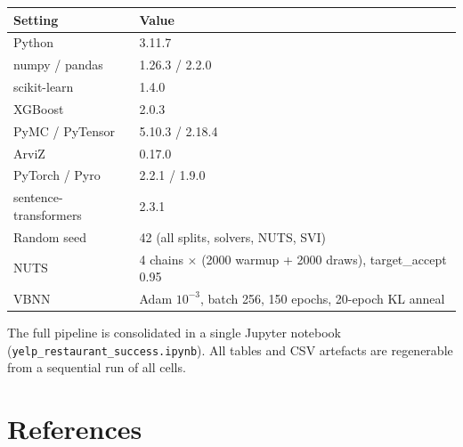 \documentclass[10pt, letterpaper]{article}
\begin{document}
\begin{center}\small
\renewcommand{\arraystretch}{1.15}
\begin{tabular}{@{}ll@{}}
\toprule
Setting & Value \\
\midrule
Python            & 3.11.7 \\
numpy / pandas    & 1.26.3 / 2.2.0 \\
scikit-learn      & 1.4.0 \\
XGBoost           & 2.0.3 \\
PyMC / PyTensor   & 5.10.3 / 2.18.4 \\
ArviZ             & 0.17.0 \\
PyTorch / Pyro    & 2.2.1 / 1.9.0 \\
sentence-transformers & 2.3.1 \\
Random seed       & 42 (all splits, solvers, NUTS, SVI) \\
NUTS              & 4 chains $\times$ (2000 warmup + 2000 draws), target\_accept 0.95 \\
VBNN              & Adam $10^{-3}$, batch 256, 150 epochs, 20-epoch KL anneal \\
\bottomrule
\end{tabular}
\end{center}

The full pipeline is consolidated in a single Jupyter notebook (\texttt{yelp\_restaurant\_success.ipynb}). All tables and CSV artefacts are regenerable from a sequential run of all cells.

\section*{References}
\end{document}
